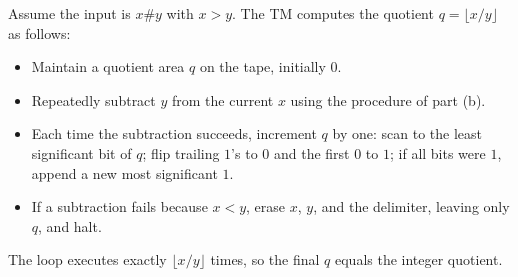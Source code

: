 \documentclass[a4paper, UTF-8]{article}
\theoremstyle{plain}
\begin{document}
Assume the input is $x \# y$ with $x > y$. The TM computes the quotient $q = \lfloor x / y \rfloor$ as follows:
\begin{itemize}
    \item Maintain a quotient area $q$ on the tape, initially $0$.
    \item Repeatedly subtract $y$ from the current $x$ using the procedure of part (b).
    \item Each time the subtraction succeeds, increment $q$ by one: scan to the least significant bit of $q$; flip trailing $1$'s to $0$ and the first $0$ to $1$; if all bits were $1$, append a new most significant $1$.
    \item If a subtraction fails because $x < y$, erase $x$, $y$, and the delimiter, leaving only $q$, and halt.
\end{itemize}
The loop executes exactly $\lfloor x / y \rfloor$ times, so the final $q$ equals the integer quotient.
\end{document}

